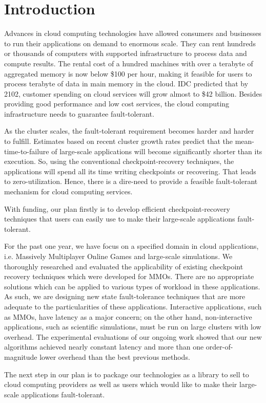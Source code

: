 \section{Introduction}
Advances in cloud computing technologies have allowed consumers and businesses
to run their applications on demand to enormous scale. They can rent hundreds
or thousands of computers with supported infrastructure to process data and
compute results. The rental cost of a hundred machines with over a terabyte of
aggregated memory is now below \$100 per hour, making it feasible for users to
process terabyte of data in main memory in the cloud. IDC predicted that by
2102, customer spending on cloud services will grow almost to \$42 billion.
Besides providing good performance and low cost services, the cloud computing
infrastructure needs to guarantee fault-tolerant.

As the cluster scales, the fault-tolerant requirement becomes harder and harder
to fulfill. Estimates based on recent cluster growth rates predict that the
mean-time-to-failure of large-scale applications will become significantly
shorter than its execution. So, using the conventional checkpoint-recovery
techniques, the applications will spend all its time writing checkpoints or
recovering. That leads to zero-utilization. Hence, there is a dire-need to
provide a feasible fault-tolerant mechanism for cloud computing services.

With funding, our plan firstly is to develop efficient
checkpoint-recovery techniques that users can easily use to make their
large-scale applications fault-tolerant.

For the past one year, we have focus on a specified domain in cloud
applications, i.e. Massively Multiplayer Online Games and large-scale
simulations. We thoroughly researched and evaluated the applicability of
existing checkpoint recovery techniques which were developed for MMOs. There
are no appropriate solutions which can be applied to various types of workload
in these applications. As such, we are designing new state fault-tolerance
techniques that are more adequate to the particularities of these applications.
Interactive applications, such as MMOs, have latency as a major concern; on the
other hand, non-interactive applications, such as scientific simulations, must
be run on large clusters with low overhead. The experimental evaluations of our
ongoing work showed that our new algorithms achieved nearly constant latency
and more than one order-of-magnitude lower overhead than the best previous
methods.

The next step in our plan is to package our technologies as a library to sell
to cloud computing providers as well as users which would like to make their
large-scale applications fault-tolerant.


